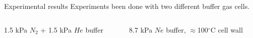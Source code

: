 \begin{block}{Experimental results}
  Experiments been done with two different buffer gas cells.
  \begin{columns}
    \begin{column}{.49\textwidth}
      \begin{center}
      \begin{figure}
        \setlength\fboxsep{0pt}
        \setlength\fboxrule{0.5pt}
      \end{figure}
      1.5 kPa $N_2$ + 1.5 kPa $He$ buffer
      \end{center}
    \end{column}
    \begin{column}{.49\textwidth}
      \begin{center}
      \begin{figure}
        \setlength\fboxsep{0pt}
        \setlength\fboxrule{0.5pt}
      \end{figure}
      8.7 kPa $Ne$ buffer, $\approx$100$^\circ$C cell wall

\end{center}
\end{column}
\end{columns}
\end{block}
